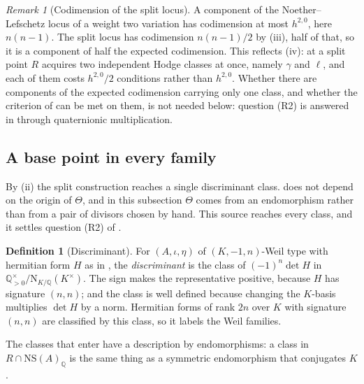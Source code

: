 \documentclass[11pt,reqno]{amsart}
\theoremstyle{plain}
\theoremstyle{definition}
\newtheorem{definition}[theorem]{Definition}
\theoremstyle{remark}
\newtheorem{remark}[theorem]{Remark}
\newcommand{\QQ}{\mathbb{Q}}
\newcommand{\NS}{\mathrm{NS}}
\newcommand{\Nm}{\mathrm{N}}             %
\begin{document}
\begin{remark}[Codimension of the split locus]
\label{rem:nlcodim}
A component of the Noether--Lefschetz locus of a weight two variation has
codimension at most $h^{2,0}$, here $n(n-1)$. The split locus has codimension
$n(n-1)/2$ by (iii), half of that, so it is a
component of half the expected codimension. This reflects
(iv): at a split point $R$ acquires two independent Hodge
classes at once, namely $\gamma$ and $\ell$, and each of them costs
$h^{2,0}/2$ conditions rather than $h^{2,0}$. Whether there are components
of the expected codimension carrying only one class, and whether the
criterion of  can be met on them, is not needed
below: question (R2) is answered in 
through quaternionic multiplication.
\end{remark}

\subsection{A base point in every family}\label{ssec:everyfamily}

By (ii) the split construction reaches a single
discriminant class.  does not depend on the origin of
$\Theta$, and in this subsection $\Theta$ comes from an endomorphism rather
than from a pair of divisors chosen by hand. This source reaches every class,
and it settles question (R2) of .

\begin{definition}[Discriminant]\label{def:disc}
For $(A,\iota,\eta)$ of $(K,-1,n)$-Weil type with hermitian form $H$ as in
, the \emph{discriminant} is the class of
$(-1)^{n}\det H$ in $\QQ^{\times}_{>0}/\Nm_{K/\QQ}(K^{\times})$. The sign
makes the representative positive, because $H$ has signature $(n,n)$; and the
class is well defined because changing the $K$-basis multiplies $\det H$ by a
norm. Hermitian forms of rank $2n$ over $K$ with signature $(n,n)$ are
classified by this class, so it labels the Weil families.
\end{definition}

The classes that enter  have a description by
endomorphisms: a class in $R\cap\NS(A)_{\QQ}$ is the same thing as a
symmetric endomorphism that conjugates $K$.
\end{document}
